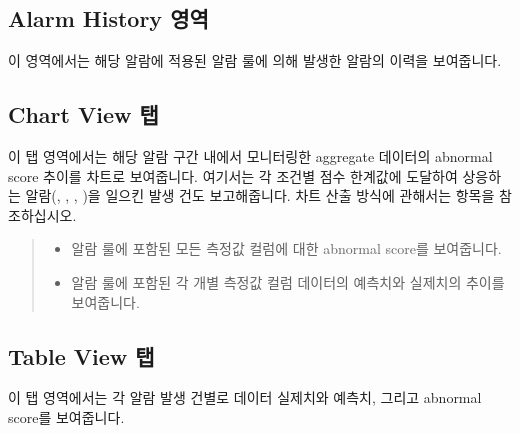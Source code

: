 \documentclass[letterpaper,10pt,english]{sphinxmanual}
\begin{document}
\subsection{Alarm History 영역}
\label{\detokenize{part05/index:alarm-history}}
이 영역에서는 해당 알람에 적용된 알람 룰에 의해 발생한 알람의 이력을 보여줍니다.
\begin{quote}

\begin{figure}[H]
\centering

\noindent{}
\end{figure}
\end{quote}


\subsection{Chart View 탭}
\label{\detokenize{part05/index:chart-view}}
이 탭 영역에서는 해당 알람 구간 내에서 모니터링한 aggregate 데이터의 abnormal score 추이를 차트로 보여줍니다. 여기서는 각 조건별 점수 한계값에 도달하여 상응하는 알람(, , , )을 일으킨 발생 건도 보고해줍니다. 차트 산출 방식에 관해서는 {\hyperref[\detokenize{part01/index:basic-principles}]{}} 항목을 참조하십시오.
\begin{quote}

\begin{figure}[H]
\centering

\noindent{}
\end{figure}
\begin{itemize}
\item {} 
 알람 룰에 포함된 모든 측정값 컬럼에 대한 abnormal score를 보여줍니다.

\item {} 
 알람 룰에 포함된 각 개별 측정값 컬럼 데이터의 예측치와 실제치의 추이를 보여줍니다.

\end{itemize}
\end{quote}


\subsection{Table View 탭}
\label{\detokenize{part05/index:table-view}}
이 탭 영역에서는 각 알람 발생 건별로 데이터 실제치와 예측치, 그리고 abnormal score를 보여줍니다.
\begin{quote}

\begin{figure}[H]
\centering

\noindent{}
\end{figure}
\end{quote}



\renewcommand{\indexname}{색인}
\printindex
\end{document}
